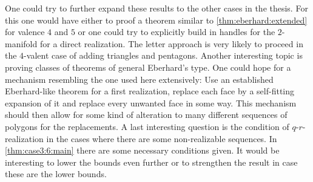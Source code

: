 One could try to further expand these results to the other cases in the thesis. For this one would have either to proof a theorem similar to \autoref{thm:eberhard:extended} for valence $4$ and $5$ or one could try to explicitly build in handles for the $2$-manifold for a direct realization. The letter approach is very likely to proceed in the $4$-valent case of adding triangles and pentagons. Another interesting topic is proving classes of theorems of general Eberhard's type. One could hope for a mechanism resembling the one used here extensively: Use an established Eberhard-like theorem for a first realization, replace each face by a self-fitting expansion of it and replace every unwanted face in some way. This mechanism should then allow for some kind of alteration to many different sequences of polygons for the replacements. A last interesting question is the condition of $q$-$r$-realization in the cases where there are some non-realizable sequences. In \autoref{thm:case3:6:main} there are some necessary conditions given. It would be interesting to lower the bounds even further or to strengthen the result in case these are the lower bounds.